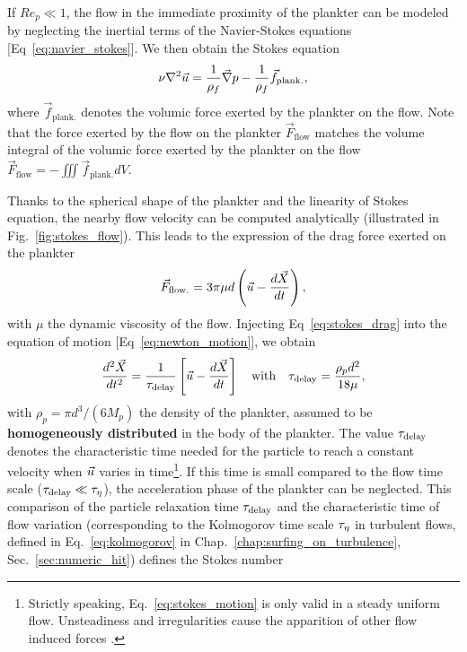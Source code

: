 If $\mathit{Re}_p \ll 1$, the flow in the immediate proximity of the plankter can be modeled by neglecting the inertial terms of the Navier-Stokes equations [Eq~\eqref{eq:navier_stokes}].
We then obtain the Stokes equation
\begin{equation}\label{eq:stokes}
	\nu \nabla^2 \vec{u} = \frac{1}{\rho_f} \vec{\nabla} p - \frac{1}{\rho_f} \vec{f}_{\mathrm{plank.}},
\end{equation}
where $\vec{f}_{\mathrm{plank.}}$ denotes the volumic force exerted by the plankter on the flow.
Note that the force exerted by the flow on the plankter $\vec{F}_{\mathrm{flow}}$ matches the volume integral of the volumic force exerted by the plankter on the flow $\vec{F}_{\mathrm{flow}} = -\iiint \vec{f}_{\mathrm{plank.}} dV$.

Thanks to the spherical shape of the plankter and the linearity of Stokes equation, the nearby flow velocity can be computed analytically (illustrated in Fig.~\ref{fig:stokes_flow}).
This leads to the expression of the drag force exerted on the plankter \citep{stokes1851effect}
\begin{equation}\label{eq:stokes_drag}
	\vec{F}_{\mathrm{flow.}} = 3 \pi \mu d \left( \vec{u} - \frac{d\vec{X}}{dt} \right),
\end{equation}
with $\mu$ the dynamic viscosity of the flow.
Injecting Eq~\eqref{eq:stokes_drag} into the equation of motion [Eq~\eqref{eq:newton_motion}], we obtain
\begin{equation}\label{eq:stokes_motion}
	\frac{d^2 \vec{X}}{d t^2} = \frac{1}{\tau_{\mathrm{delay}}} \left[ \vec{u} - \frac{d\vec{X}}{dt} \right] \quad \text{with} \quad \tau_{\mathrm{delay}} = \frac{\rho_p d^2}{18 \mu},
\end{equation}
with $\rho_p = \pi d^3/(6 M_p)$ the density of the plankter, assumed to be \textbf{homogeneously distributed} in the body of the plankter.
The value $\tau_{\mathrm{delay}}$ denotes the characteristic time needed for the particle to reach a constant velocity when $\vec{u}$ varies in time\footnote{Strictly speaking, Eq.~\eqref{eq:stokes_motion} is only valid in a steady uniform flow. Unsteadiness and irregularities cause the apparition of other flow induced forces \citep{maxey1987motion, wang2012unsteady, more2020motion}.}.
If this time is small compared to the flow time scale ($\tau_{\mathrm{delay}} \ll \tau_{\eta}$), the acceleration phase of the plankter can be neglected.
This comparison of the particle relaxation time $\tau_{\mathrm{delay}}$ and the characteristic time of flow variation (corresponding to the Kolmogorov time scale $\tau_{\eta}$ in turbulent flows, defined in Eq.~\ref{eq:kolmogorov} in Chap.~\ref{chap:surfing_on_turbulence}, Sec.~\ref{sec:numeric_hit}) defines the Stokes number

